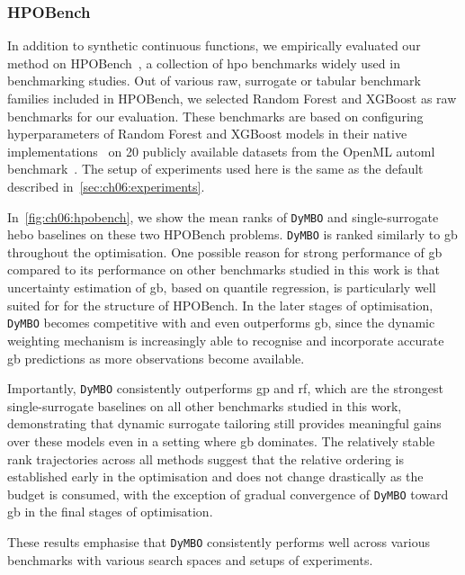 \subsubsection{HPOBench}
\label{sec:ch06:hpobench}

In addition to synthetic continuous functions, we empirically evaluated our method on HPOBench~\citep{EggEtAl21}, a collection of \gls{hpo} benchmarks widely used in benchmarking studies.
Out of various raw, surrogate or tabular benchmark families included in HPOBench, we selected Random Forest and XGBoost as raw benchmarks for our evaluation.
These benchmarks are based on configuring hyperparameters of Random Forest and XGBoost models in their native implementations~\citep{PedEtAl11b,CheGue16} on 20 publicly available datasets from the OpenML \gls{automl} benchmark~\citep{GijEtAl19}.
The setup of experiments used here is the same as the default described in~\cref{sec:ch06:experiments}.

In~\cref{fig:ch06:hpobench}, we show the mean ranks of \texttt{DyMBO} and single-surrogate \gls{hebo} baselines on these two HPOBench problems.
\texttt{DyMBO} is ranked similarly to \gls{gb} throughout the optimisation.
One possible reason for strong performance of \gls{gb} compared to its performance on other benchmarks studied in this work is that uncertainty estimation of \gls{gb}, based on quantile regression, is particularly well suited for for the structure of HPOBench.
In the later stages of optimisation, \texttt{DyMBO} becomes competitive with and even outperforms \gls{gb}, since the dynamic weighting mechanism is increasingly able to recognise and incorporate accurate \gls{gb} predictions as more observations become available.

Importantly, \texttt{DyMBO} consistently outperforms \gls{gp} and \gls{rf}, which are the strongest single-surrogate baselines on all other benchmarks studied in this work, demonstrating that dynamic surrogate tailoring still provides meaningful gains over these models even in a setting where \gls{gb} dominates.
The relatively stable rank trajectories across all methods suggest that the relative ordering is established early in the optimisation and does not change drastically as the budget is consumed, with the exception of gradual convergence of \texttt{DyMBO} toward \gls{gb} in the final stages of optimisation.

These results emphasise that \texttt{DyMBO} consistently performs well across various benchmarks with various search spaces and setups of experiments.


